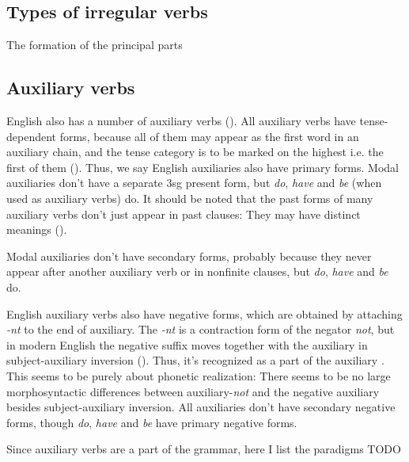\documentclass[UTF8, a4paper, oneside, scheme=plain]{ctexrep}
\newcommand*{\citepage}[1]{pp.~{#1}}
\newcommand{\corpus}[1]{\emph{#1}}
\begin{document}
\subsection{Types of irregular verbs}

The formation of the principal parts 

\subsection{Auxiliary verbs}\label{sec:verb-inflection.auxiliary}

English also has a number of auxiliary verbs ().
All auxiliary verbs have tense-dependent forms,
because all of them may appear as the first word in an auxiliary chain,
and the tense category is to be marked on the highest i.e. the first of them ().
Thus, we say English auxiliaries also have primary forms.
Modal auxiliaries don't have a separate 3sg present form,
but \corpus{do}, \corpus{have} and \corpus{be} (when used as auxiliary verbs) do.
It should be noted that the past forms of many auxiliary verbs don't just appear in past clauses:
They may have distinct meanings ().

Modal auxiliaries don't have secondary forms,
probably because they never appear after another auxiliary verb 
or in nonfinite clauses,
but \corpus{do}, \corpus{have} and \corpus{be} do.

English auxiliary verbs also have negative forms,
which are obtained by attaching \corpus{-nt} to the end of auxiliary.
The \corpus{-nt} is a contraction form of the negator \corpus{not},
but in modern English the negative suffix moves together with the auxiliary in
subject-auxiliary inversion ().
Thus, it's recognized as a part of the auxiliary \citep[\citepage{91}]{cgel}.
This seems to be purely about phonetic realization:
There seems to be no large morphosyntactic differences 
between auxiliary-\corpus{not} and the negative auxiliary
besides subject-auxiliary inversion.
All auxiliaries don't have secondary negative forms,
though \corpus{do}, \corpus{have} and \corpus{be} have primary negative forms.

Since auxiliary verbs are a part of the grammar,
here I list the paradigms TODO
\end{document}
